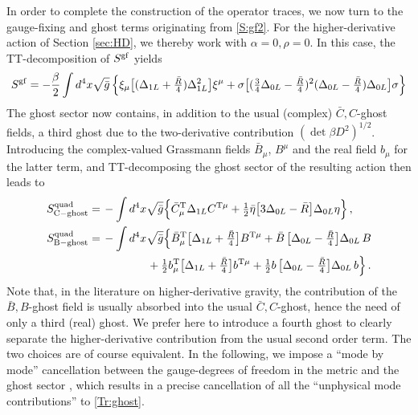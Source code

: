 \documentclass[preprint,preprintnumbers,amsmath,amssymb,nofootinbib,APS]{revtex4}
\newcommand{\be}{\begin{equation}}
\newcommand{\ee}{\end{equation}}
\newcommand{\2}{\sqrt{2\,}}
\newcommand{\gb}{\bar{g}}
\newcommand{\Cb}{\bar{C}}
\newcommand{\Rb}{\bar{R}}
\begin{document}
\begin{appendix}
In order to complete the construction of the operator traces, we now turn to the gauge-fixing
and ghost terms originating from \eqref{S:gf2}. For the higher-derivative action of Section \ref{sec:HD},
we thereby work with $\alpha = 0, \rho =0$. In this case, the TT-decomposition of $S^{\rm gf}$
yields
%
\be\label{Sgf}
S^{\rm gf} = - \frac{\beta}{2} \int d^4x \sqrt{\gb}
\left\{
\xi_\mu \big[ (\Delta_{1L} + \tfrac{\Rb}{4} ) \Delta_{1L}^2 \big] \xi^\mu
+ \sigma \big[ (\tfrac{3}{4} \Delta_{0L} - \tfrac{\Rb}{4} )^2 (\Delta_{0L} - \tfrac{\Rb}{4})\Delta_{0L}
\big] \sigma
\right\}
\ee
%
The ghost sector now contains, in addition to the usual (complex) $\Cb,C$-ghost fields, a third ghost \cite{Barth:1983hb} due to the two-derivative contribution
$(\det{\beta D^2})^{1/2}$. Introducing the complex-valued Grassmann fields $\bar{B}_\mu$, $B^\mu$ and the real field $b_\mu$ for the latter term, and TT-decomposing the ghost sector of the resulting action then leads to 
%
\be
\begin{split}
S_{\rm C-ghost}^{\rm quad} = & \, - \int d^4x \sqrt{\gb} \Big\{
\Cb^{\rm T}_\mu  \Delta_{1L} C^{{\rm T} \mu}
+ \tfrac{1}{2} \bar \eta \big[ 3 \Delta_{0L} - \Rb  \big] \Delta_{0L} \eta 
\Big\} \, , \\
%
S_{\rm B-ghost}^{\rm quad} = & \, -  \int d^4x \sqrt{\gb} \Big\{
\bar{B}_\mu^{\rm T} \big[ \Delta_{1L} + \tfrac{\Rb}{4} \big] B^{{\rm T}\mu}
+ \bar{B} \, \big[ \Delta_{0L} - \tfrac{\Rb}{4} \big] \Delta_{0L} \, B \\
& \qquad\qquad\, + \tfrac{1}{2} b_\mu^{\rm T} \big[ \Delta_{1L} + \tfrac{\Rb}{4} \big] b^{{\rm T}\mu}
+ \tfrac{1}{2} b \, \big[ \Delta_{0L} - \tfrac{\Rb}{4} \big] \Delta_{0L} \, b
\Big\} \, .
\end{split}
\ee
%
Note that, in the literature on higher-derivative gravity, the contribution of the $\bar{B},B$-ghost field is usually absorbed into the usual $\Cb,C$-ghost, hence the need of only a third (real) ghost. We prefer here to introduce a fourth ghost to clearly separate the higher-derivative contribution from the usual second order term. The two choices are of course equivalent. In the following, we impose a ``mode by mode'' cancellation between the gauge-degrees of freedom in the metric and the ghost sector \cite{Codello:2007bd}, which results in a precise cancellation of all the ``unphysical mode contributions'' to \eqref{Tr:ghost}. 


\end{appendix}
\end{document}
